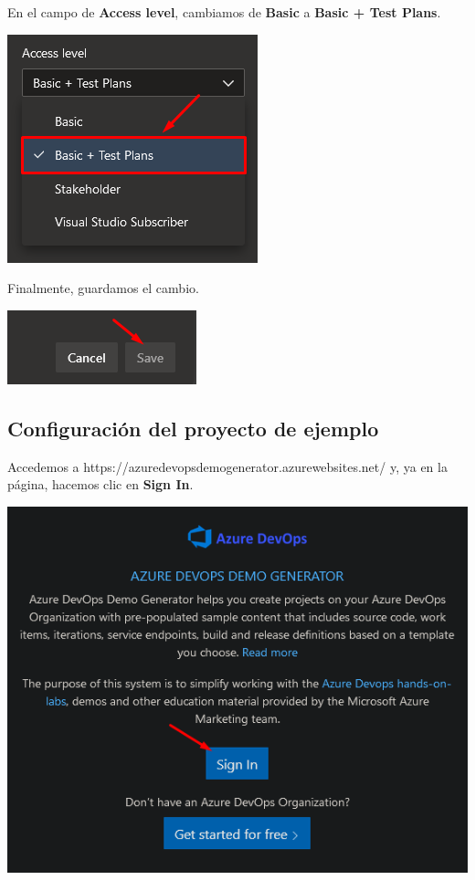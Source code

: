 \documentclass{elsarticle}
\begin{document}
En el campo de \textbf{Access level}, cambiamos de \textbf{Basic} a \textbf{Basic + Test Plans}.
\begin{center}
	\includegraphics{img/Screenshot_7.png}
\end{center}

Finalmente, guardamos el cambio.
\begin{center}
	\includegraphics{img/Screenshot_8.png}
\end{center}

\subsection{Configuración del proyecto de ejemplo}

Accedemos a https://azuredevopsdemogenerator.azurewebsites.net/ y, ya en la página, hacemos clic en \textbf{Sign In}.
\begin{center}
	\includegraphics[width=\columnwidth]{img/Screenshot_9.png}
\end{center}
\end{document}
